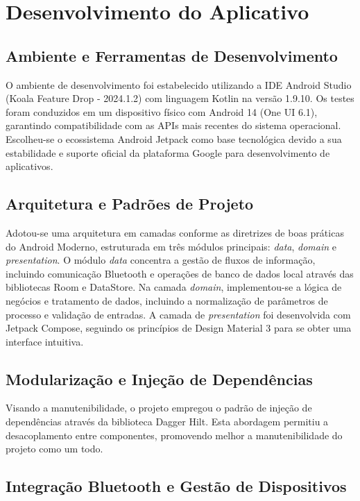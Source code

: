 \section{Desenvolvimento do Aplicativo}
\subsection{Ambiente e Ferramentas de Desenvolvimento}

O ambiente de desenvolvimento foi estabelecido utilizando a IDE Android Studio (Koala Feature Drop - 2024.1.2) com linguagem Kotlin na versão 1.9.10. Os testes foram conduzidos em um dispositivo físico com Android 14 (One UI 6.1), garantindo compatibilidade com as APIs mais recentes do sistema operacional. Escolheu-se o ecossistema Android Jetpack como base tecnológica devido a sua estabilidade e suporte oficial da plataforma Google para desenvolvimento de aplicativos.

\subsection{Arquitetura e Padrões de Projeto}

Adotou-se uma arquitetura em camadas conforme as diretrizes de boas práticas do Android Moderno, estruturada em três módulos principais: \textit{data}, \textit{domain} e \textit{presentation}. O módulo \textit{data} concentra a gestão de fluxos de informação, incluindo comunicação Bluetooth e operações de banco de dados local através das bibliotecas Room e DataStore. Na camada \textit{domain}, implementou-se a lógica de negócios e tratamento de dados, incluindo a normalização de parâmetros de processo e validação de entradas. A camada de \textit{presentation} foi desenvolvida com Jetpack Compose, seguindo os princípios de Design Material 3 para se obter uma interface intuitiva.

\subsection{Modularização e Injeção de Dependências}

Visando a manutenibilidade, o projeto empregou o padrão de injeção de dependências através da biblioteca Dagger Hilt. Esta abordagem permitiu a desacoplamento entre componentes, promovendo melhor a manutenibilidade do projeto como um todo. 

\subsection{Integração Bluetooth e Gestão de Dispositivos}

